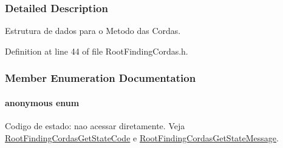 \subsubsection{Detailed Description}
Estrutura de dados para o Metodo das Cordas. 

Definition at line 44 of file RootFindingCordas.h.

\subsubsection{Member Enumeration Documentation}
\hypertarget{structRootFindingCordas_9720f2b18833ec99c78c5d1fc2e675b1}{
\paragraph["@4]{\setlength{\rightskip}{0pt plus 5cm}anonymous enum}\hfill}
\label{structRootFindingCordas_9720f2b18833ec99c78c5d1fc2e675b1}


Codigo de estado: nao acessar diretamente. Veja \hyperlink{group____cordas_g67aaf428f922e7d15a7fbd5a4508ffd7}{RootFindingCordasGetStateCode} e \hyperlink{group____cordas_ga065f13f2ec77b2e949190c1aca9ef9d}{RootFindingCordasGetStateMessage}. 

